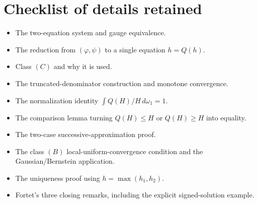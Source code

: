 \section*{Checklist of details retained}
\begin{itemize}[leftmargin=2em]
\item The two-equation system and gauge equivalence.
\item The reduction from $(\varphi,\psi)$ to a single equation $h=Q(h)$.
\item Class $(C)$ and why it is used.
\item The truncated-denominator construction and monotone convergence.
\item The normalization identity $\int Q(H)/H\,d\omega_1=1$.
\item The comparison lemma turning $Q(H)\le H$ or $Q(H)\ge H$ into equality.
\item The two-case successive-approximation proof.
\item The class $(B)$ local-uniform-convergence condition and the Gaussian/Bernstein application.
\item The uniqueness proof using $h=\max(h_1,h_2)$.
\item Fortet's three closing remarks, including the explicit signed-solution example.
\end{itemize}



